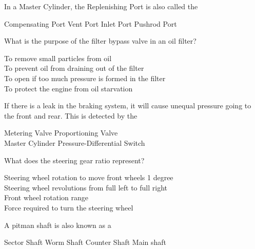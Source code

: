 \documentclass[12pt]{exam}
\begin{document}
\begin{questions}
				\question In a Master Cylinder, the Replenishing Port is also called the  \\
				\begin{oneparchoices}					
					\choice Compensating Port
					\choice Vent Port
					\choice Inlet Port
					\choice Pushrod Port
				\end{oneparchoices}
			
				\question What is the purpose of the filter bypass valve in an oil filter? \\
				\begin{oneparchoices} 
					\choice To remove small particles from oil \\
					\choice To prevent oil from draining out of the filter \\
					\choice To open if too much pressure is formed in the filter \\
					\choice To protect the engine from oil starvation 
				\end{oneparchoices}
			
				\question If there is a leak in the braking system, it will cause unequal pressure going to the front and rear. This is detected by the  \\
				\begin{oneparchoices}					
					\choice Metering Valve
					\choice Proportioning Valve \\
					\choice Master Cylinder
					\choice Pressure-Differential Switch					
				\end{oneparchoices}
				
				\question What does the steering gear ratio represent? \\
				\begin{oneparchoices} 
					\choice Steering wheel rotation to move front wheels 1 degree \\ 
                    \choice Steering wheel revolutions from full left to full right \\
					\choice Front wheel rotation range \\
					\choice Force required to turn the steering wheel 
				\end{oneparchoices}
				
				\question A pitman shaft is also known as a \\
				\begin{oneparchoices} 
					\choice Sector Shaft
					\choice Worm Shaft
					\choice Counter Shaft
					\choice Main shaft
				\end{oneparchoices}
				

\end{questions}
\end{document}

